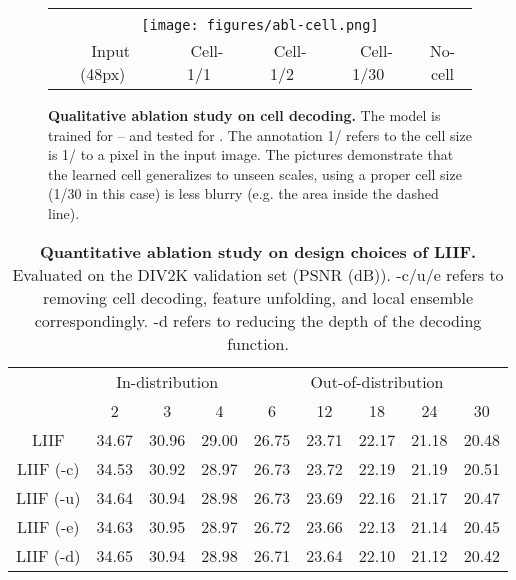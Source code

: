 \documentclass[final]{cvpr}
\begin{document}
\begin{figure*}[]
    \centering
    \begin{tabular}{ccccc}
        \hspace{22mm} & \hspace{33mm} & \hspace{33mm} & \hspace{33mm} & \hspace{33mm} \\
        \multicolumn{5}{c}{\texttt{[image: figures/abl-cell.png]}} \\
        ~~Input (48px) & ~~Cell-1/1 & ~~Cell-1/2 & ~~Cell-1/30 & No-cell
    \end{tabular}
    \caption{\textbf{Qualitative ablation study on cell decoding.} The model is trained for -- and tested for . The annotation 1/ refers to the cell size is 1/ to a pixel in the input image. The pictures demonstrate that the learned cell generalizes to unseen scales, using a proper cell size (1/30 in this case) is less blurry (e.g. the area inside the dashed line).}
    \label{fig:div2k-abl-cell}
\end{figure*}

\begin{table*}[]
    \centering
    \begin{tabular}{c|ccc|ccccc}
        & \multicolumn{3}{c|}{In-distribution} & \multicolumn{5}{c}{Out-of-distribution} \\
        & 2 & 3 & 4 & 6 & 12 & 18 & 24 & 30 \\
        \hline
        LIIF & 34.67 & 30.96 & 29.00 & 26.75 & 23.71 & 22.17 & 21.18 & 20.48 \\
        LIIF (-c) & 34.53 & 30.92 & 28.97 & 26.73 & 23.72 & 22.19 & 21.19 & 20.51 \\
        LIIF (-u) & 34.64 & 30.94 & 28.98 & 26.73 & 23.69 & 22.16 & 21.17 & 20.47 \\
        LIIF (-e) & 34.63 & 30.95 & 28.97 & 26.72 & 23.66 & 22.13 & 21.14 & 20.45 \\
        LIIF (-d) & 34.65 & 30.94 & 28.98 & 26.71 & 23.64 & 22.10 & 21.12 & 20.42 \\
    \end{tabular}
    \caption{\textbf{Quantitative ablation study on design choices of LIIF.} Evaluated on the DIV2K validation set (PSNR (dB)). -c/u/e refers to removing cell decoding, feature unfolding, and local ensemble correspondingly. -d refers to reducing the depth of the decoding function.}
    \label{tab:div2k-abl-all}
\end{table*}
\end{document}
